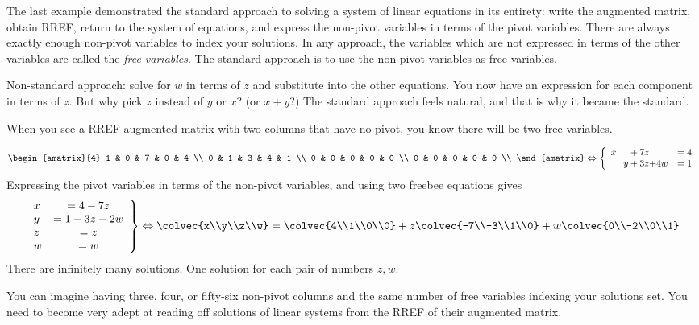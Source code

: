 The last example demonstrated the standard approach to solving a system of linear equations in its entirety: write the augmented matrix, obtain RREF, return to the system of equations, and express the non-pivot variables in terms of the pivot variables. 
There are always exactly enough non-pivot variables to index your solutions. 
In any approach, the variables which are not expressed in terms of the other variables are called the {\itshape free variables}. The standard approach is to use the non-pivot variables as free variables.

Non-standard approach: solve for $w$ in terms of $z$ and substitute into the other equations. You now have an expression for each component in terms of $z$. But why pick $z$ instead of $y$ or $x$? (or $x+y$?) The standard approach feels natural, and that is why it became the standard.

When you see a RREF augmented matrix with two columns that have no pivot, you know there will be two free variables. 

\begin{example}
\[
 \begin{amatrix}{4} 
1 & 0 & 7 & 0 & 4 \\ 
0 & 1 & 3 & 4 & 1 \\ 
0 & 0 & 0 & 0 & 0 \\ 
0 & 0 & 0 & 0 & 0 \\ 
\end{amatrix}
\Leftrightarrow
\left\{
\begin{array}{lcr}
	x \phantom{+y}    + 7z  \phantom{+w} & = 4 \\
	\phantom {x+}   y + 3z  {+4w} & = 1 \\
     \end{array}
     \right.
\]
Expressing the pivot variables in terms of the non-pivot variables, and using two freebee equations gives
\[
\left.
\begin{array}{lcr}
	x & = 4 -7z \\
	 y  & = 1 -3z-2w\\
	 z         & = z\\
	w & =w          
     \end{array}
     \right\}
     \Leftrightarrow
\colvec{x\\y\\z\\w} = \colvec{4\\1\\0\\0} + z\colvec{-7\\-3\\1\\0} + w\colvec{0\\-2\\0\\1}
\]
There are infinitely many solutions. One solution for each pair of numbers $z,w$. 
\end{example}
You can imagine having three, four, or fifty-six non-pivot columns and the same number of free variables indexing your solutions set. You need to become very adept at reading off solutions of linear systems from the RREF
of their augmented matrix. 


